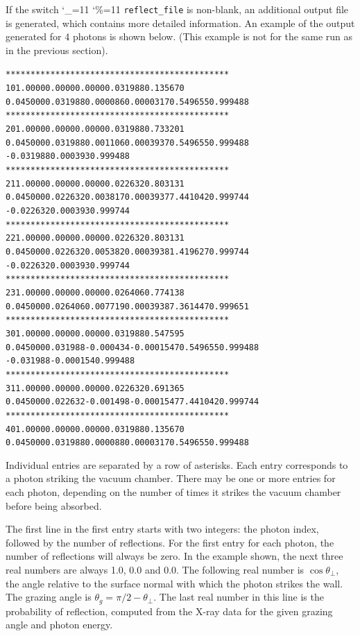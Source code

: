 \documentclass[11pt]{article}
\newcommand\ttcmd{\begingroup\catcode`\_=11 \catcode`\%=11 \dottcmd}
\newcommand\dottcmd[1]{\texttt{#1}\endgroup}
\newcommand{\vn}{\ttcmd}
\newlength{\ExBeg}
\newlength{\ExEnd}
\newenvironment{example}
  {\vspace{\ExBeg} \begin{alltt}}
  {\end{alltt} \vspace{\ExEnd}}
\begin{document}
If the switch \vn{reflect_file} is non-blank, an additional output
file is generated, which contains more detailed information. An
example of the output generated for 4 photons is shown below. (This
example is not for the same run as in the previous section).
\begin{example}
*********************************************
       1       0    1.0000    0.0000    0.0000              0.031988    0.135670
    0.045000    0.031988    0.000086    0.000031   70.549655    0.999488
 *********************************************
       2       0    1.0000    0.0000    0.0000              0.031988    0.733201
    0.045000    0.031988    0.001106    0.000393   70.549655    0.999488
               -0.031988                0.000393                0.999488
 *********************************************
       2       1    1.0000    0.0000    0.0000              0.022632    0.803131
    0.045000    0.022632    0.003817    0.000393   77.441042    0.999744
               -0.022632                0.000393                0.999744
 *********************************************
       2       2    1.0000    0.0000    0.0000              0.022632    0.803131
    0.045000    0.022632    0.005382    0.000393   81.419627    0.999744
               -0.022632                0.000393                0.999744
 *********************************************
       2       3    1.0000    0.0000    0.0000              0.026406    0.774138
    0.045000    0.026406    0.007719    0.000393   87.361447    0.999651
 *********************************************
       3       0    1.0000    0.0000    0.0000              0.031988    0.547595
    0.045000    0.031988   -0.000434   -0.000154   70.549655    0.999488
               -0.031988               -0.000154                0.999488
 *********************************************
       3       1    1.0000    0.0000    0.0000              0.022632    0.691365
    0.045000    0.022632   -0.001498   -0.000154   77.441042    0.999744
 *********************************************
       4       0    1.0000    0.0000    0.0000              0.031988    0.135670
    0.045000    0.031988    0.000088    0.000031   70.549655    0.999488
\end{example}
Individual entries are separated by a row of asterisks. Each entry
corresponds to a photon striking the vacuum chamber. There may be one
or more entries for each photon, depending on the number of times it
strikes the vacuum chamber before being absorbed.

The first line in the first entry starts with two integers: the photon
index, followed by the number of reflections. For the first entry for
each photon, the number of reflections will always be zero. In the
example shown, the next three real numbers are always 1.0, 0.0 and
0.0. The following real number is $\cos{\theta_\perp}$, the angle
relative to the surface normal with which the photon strikes the
wall. The grazing angle is $\theta_g=\pi/2-\theta_\perp.$ The last
real number in this line is the probability of reflection, computed
from the X-ray data for the given grazing angle and photon energy.
\end{document}
